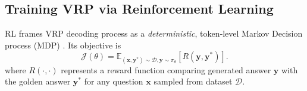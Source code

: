 \subsection{Training VRP via Reinforcement Learning}
\label{sec:preliminaries.rl}
RL frames VRP decoding process as a \textit{deterministic}, token‐level Markov Decision process (MDP) \citep{wang2024openr}. Its objective is
\begin{equation*}
    \mathcal{J}(\theta) = \mathbb{E}_{(\mathbf{x}, \mathbf{y}^*)\sim \mathcal{D}, \mathbf{y}\sim \pi_\theta}\left[ R(\mathbf{y}, \mathbf{y}^*) \right].
\end{equation*}
where $R(\cdot, \cdot)$ represents a reward function comparing generated answer $\mathbf{y}$ with the golden answer $\mathbf{y^*}$ for any question $\mathbf{x}$ sampled from dataset $\mathcal{D}$.

